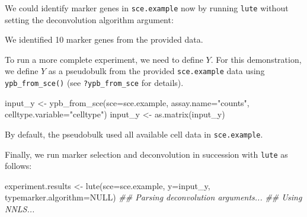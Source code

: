 \documentclass[]{article}
\newcommand{\hlnum}[1]{\textcolor[rgb]{0.816,0.125,0.439}{#1}}%
\newcommand{\hlstr}[1]{\textcolor[rgb]{0.251,0.627,0.251}{#1}}%
\newcommand{\hlcom}[1]{\textcolor[rgb]{0.502,0.502,0.502}{\textit{#1}}}%
\newcommand{\hlstd}[1]{\textcolor[rgb]{0.251,0.251,0.251}{#1}}%
\newenvironment{Shaded}{\begin{myshaded}}{\end{myshaded}}
\newcommand{\ConstantTok}[1]{\hlnum{#1}}
\newcommand{\SpecialCharTok}[1]{\hlstr{#1}}
\newcommand{\StringTok}[1]{\hlstr{#1}}
\newcommand{\DocumentationTok}[1]{\hlcom{#1}}
\newcommand{\OtherTok}[1]{{#1}}
\newcommand{\FunctionTok}[1]{\hlstd{#1}}
\newcommand{\AttributeTok}[1]{{#1}}
\newcommand{\NormalTok}[1]{\hlstd{#1}}
\begin{document}
We could identify marker genes in \texttt{sce.example} now by running \texttt{lute} without
setting the deconvolution algorithm argument:

\begin{Shaded}
\end{Shaded}

We identified 10 marker genes from the provided data.

To run a more complete experiment, we need to define \(Y\). For this demonstration,
we define \(Y\) as a pseudobulk from the provided \texttt{sce.example} data using
\texttt{ypb\_from\_sce()} (see \texttt{?ypb\_from\_sce} for details).

\begin{Shaded}
\begin{Highlighting}[]
\NormalTok{input\_y }\OtherTok{\textless{}{-}} \FunctionTok{ypb\_from\_sce}\NormalTok{(}\AttributeTok{sce=}\NormalTok{sce.example, }
                  \AttributeTok{assay.name=}\StringTok{"counts"}\NormalTok{, }
                  \AttributeTok{celltype.variable=}\StringTok{"celltype"}\NormalTok{)}
\NormalTok{input\_y }\OtherTok{\textless{}{-}} \FunctionTok{as.matrix}\NormalTok{(input\_y)}
\end{Highlighting}
\end{Shaded}

By default, the pseudobulk used all available cell data in \texttt{sce.example}.

Finally, we run marker selection and deconvolution in succession with \texttt{lute} as
follows:

\begin{Shaded}
\begin{Highlighting}[]
\NormalTok{experiment.results }\OtherTok{\textless{}{-}} \FunctionTok{lute}\NormalTok{(}\AttributeTok{sce=}\NormalTok{sce.example, }\AttributeTok{y=}\NormalTok{input\_y, }
                           \AttributeTok{typemarker.algorithm=}\ConstantTok{NULL}\NormalTok{)}
\DocumentationTok{\#\# Parsing deconvolution arguments...}
\DocumentationTok{\#\# Using NNLS...}
\end{Highlighting}
\end{Shaded}
\end{document}
